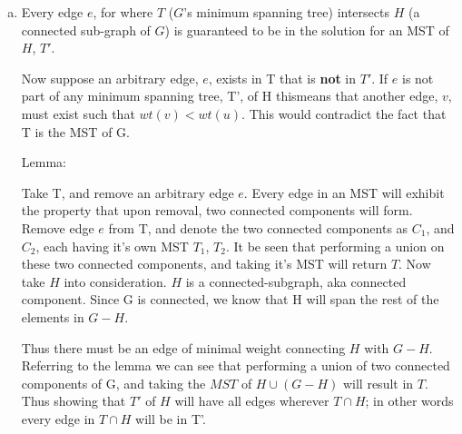 \documentclass[10pt]{article}
\begin{document}
\begin{question}
    \begin{enumerate}[a)]
        \item
            Every edge $e$, for where $T$ ($G$'s minimum spanning tree) intersects $H$ (a connected sub-graph of $G$) is guaranteed to be in the solution for an MST of $H$, $T'$.
            
            Now suppose an arbitrary edge, $e$, exists in T that is \textbf{not} in $T'$. If $e$ is not part of any minimum spanning tree, T’, of H thismeans that another edge, $v$, must exist such that $wt(v) < wt(u)$. This would contradict the fact that T is the MST of G.
            
           Lemma: \\ 
           
           Take T, and remove an arbitrary edge $e$. Every edge in an MST will exhibit the property that upon removal, two connected components will form. Remove edge $e$ from T, and denote the two connected components as $C_1$, and $C_2$, each having it's own MST $T_1$, $T_2$. It be seen that performing a union on these two connected components, and taking it's MST will return $T$. Now take $H$ into consideration. $H$ is a connected-subgraph, aka connected component. Since G is connected, we know that H will span the rest of the elements in $G - H$.
           
           Thus there must be an edge of minimal weight connecting $H$ with $G - H$. Referring to the lemma we can see that performing a union of two connected components of G, and taking the $MST$ of $H \cup (G-H)$ will result in $T$. Thus showing that $T'$ of $H$ will have all edges wherever $T \cap H$; in other words every edge in $T \cap H$ will be in T'.
    \end{enumerate}  
\end{question}
\end{document}
